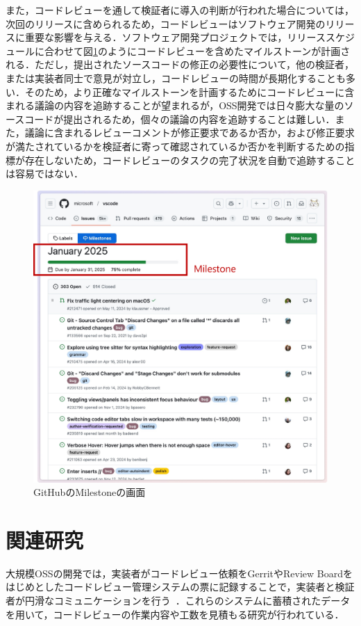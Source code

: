 \documentclass[11pt]{jreport}
\begin{document}
また，コードレビューを通して検証者に導入の判断が行われた場合については，次回のリリースに含められるため，コードレビューはソフトウェア開発のリリースに重要な影響を与える．ソフトウェア開発プロジェクトでは，リリーススケジュールに合わせて図\ref{fig:milestone}のようにコードレビューを含めたマイルストーンが計画される．ただし，提出されたソースコードの修正の必要性について，他の検証者，または実装者同士で意見が対立し，コードレビューの時間が長期化することも多い\cite{review_time1}\cite{review_time2}．そのため，より正確なマイルストーンを計画するためにコードレビューに含まれる議論の内容を追跡することが望まれるが，OSS開発では日々膨大な量のソースコードが提出されるため，個々の議論の内容を追跡することは難しい．また，議論に含まれるレビューコメントが修正要求であるか否か，および修正要求が満たされているかを検証者に寄って確認されているか否かを判断するための指標が存在しないため，コードレビューのタスクの完了状況を自動で追跡することは容易ではない．

\begin{figure}[t]
\centerline{\includegraphics[width=0.9\linewidth]{@BSthesis2024_Kawasaki/BSthesis2024_Kawasaki_fig/milestone.pdf}}
\caption{GitHubのMilestoneの画面}
\label{fig:milestone}
\end{figure}

\section{関連研究}
大規模OSSの開発では，実装者がコードレビュー依頼をGerritやReview Boardをはじめとしたコードレビュー管理システムの票に記録することで，実装者と検証者が円滑なコミュニケーションを行う~\cite{code_review}．これらのシステムに蓄積されたデータを用いて，コードレビューの作業内容や工数を見積もる研究が行われている．
\end{document}
